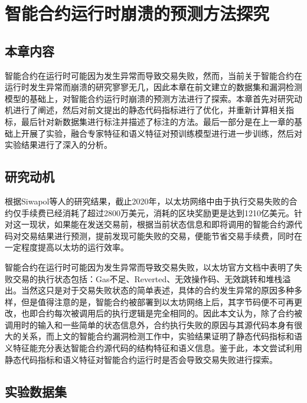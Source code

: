 \chapter{智能合约运行时崩溃的预测方法探究}
\section{本章内容}
\label{sec:本章内容5}

智能合约在运行时可能因为发生异常而导致交易失败，然而，当前关于智能合约在运行时发生异常而崩溃的研究寥寥无几，因此本章在前文建立的数据集和漏洞检测模型的基础上，对智能合约运行时崩溃的预测方法进行了探索。本章首先对研究动机进行了阐述，然后对前文提出的静态代码指标进行了优化，并重新计算相关指标，最后针对新数据集进行标注并描述了标注的方法。最后一部分是在上一章的基础上开展了实验，融合专家特征和语义特征对预训练模型进行进一步训练，然后对实验结果进行了深入的分析。
\section{研究动机}
\label{sec:研究动机}
根据Siwapol等人的研究结果\cite{reducing2020}，截止2020年，以太坊网络中由于执行交易失败的合约仅手续费已经消耗了超过2800万美元，消耗的区块奖励更是达到1210亿美元。针对这一现状，如果能在发送交易前，根据当前状态信息和即将调用的智能合约源代码对交易结果进行预测，提前发现可能失败的交易，便能节省交易手续费，同时在一定程度提高以太坊的运行效率。

智能合约在运行时可能因为发生异常而导致交易失败，以太坊官方文档中表明了失败交易的执行状态包括：Gas不足、Reverted、无效操作码、无效跳转和堆栈溢出。当然这只是对于交易失败状态的简单表述，具体的合约发生异常的原因多种多样，但是值得注意的是，智能合约被部署到以太坊网络上后，其字节码便不可再更改，也即合约每次被调用后的执行逻辑是完全相同的。因此本文认为，除了合约被调用时的输入和一些简单的状态信息外，合约执行失败的原因与其源代码本身有很大的关系，而上文的智能合约漏洞检测工作中，实验结果证明了静态代码指标和语义特征能充分表达智能合约源代码的结构特征和语义信息。鉴于此，本文尝试利用静态代码指标和语义特征对智能合约运行时是否会导致交易失败进行探索。


\section{实验数据集}
\label{sec:实验数据集}


